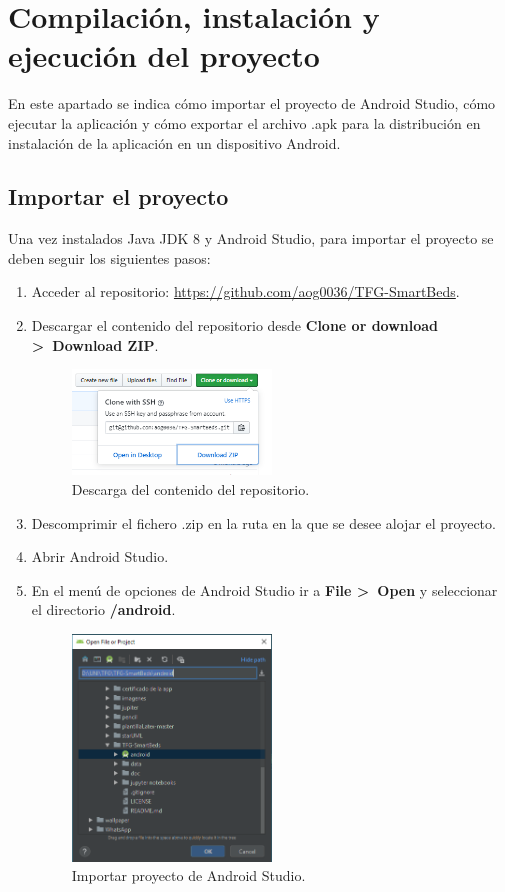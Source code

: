 \section{Compilación, instalación y ejecución del proyecto}

En este apartado se indica cómo importar el proyecto de Android Studio, cómo ejecutar la aplicación y cómo exportar el archivo .apk para la distribución en instalación de la aplicación en un dispositivo Android. 

\subsection{Importar el proyecto}

Una vez instalados Java JDK 8 y Android Studio, para importar el proyecto se deben seguir los siguientes pasos: 

\begin{enumerate}
	\item Acceder al repositorio: \url{https://github.com/aog0036/TFG-SmartBeds}. 
	\item Descargar el contenido del repositorio desde \textbf{Clone or download >~Download ZIP}. 
	\begin{figure}[H]
		\centering
		\includegraphics[width=0.5\textwidth]{../img/download.png}
		\caption{Descarga del contenido del repositorio.}
		\label{fig:download}
	\end{figure}
	\item Descomprimir el fichero .zip en la ruta en la que se desee alojar el proyecto. 
	\item Abrir Android Studio. 
	\item En el menú de opciones de Android Studio ir a \textbf{File >~Open} y seleccionar el directorio \textbf{/android}. 
	\begin{figure}[H]
		\centering
		\includegraphics[width=0.5\textwidth]{../img/open.png}
		\caption{Importar proyecto de Android Studio.}
		\label{fig:open}
	\end{figure}
\end{enumerate}

